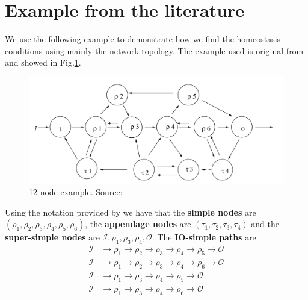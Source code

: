 \section{Example from the literature}
\label{sec:example}

We use the following example to demonstrate how we find the homeostasis 
conditions using mainly the network topology. The example used is original 
from \cite{wang2021} and showed in Fig.\ref{fig:fig1}.

\begin{figure}[H]
    \centering
    \includegraphics[scale=0.36]{figs/fig2_example.png}
    \caption{12-node example. Source: \cite{wang2021}}
    \label{fig:fig1}
\end{figure}

Using the notation provided by \cite{wang2021} we have that the
\textbf{simple nodes} are $(\rho_1, \rho_2, \rho_3, \rho_4, \rho_5, \rho_6)$,
the \textbf{appendage nodes} are $(\tau_1, \tau_2, \tau_3, \tau_4)$ and the 
\textbf{super-simple nodes} are $\mathcal{I}, \rho_1, \rho_3, \rho_4, \mathcal{O}$.
The \textbf{IO-simple paths} are 
\begin{equation}
    \begin{aligned}
        \mathcal{I}& \rightarrow \rho_1 \rightarrow \rho_2 
        \rightarrow \rho_3 \rightarrow \rho_4 \rightarrow \rho_5 \rightarrow \mathcal{O}\\
        \mathcal{I}& \rightarrow \rho_1 \rightarrow \rho_2 
        \rightarrow \rho_3 \rightarrow \rho_4 \rightarrow \rho_6 \rightarrow \mathcal{O}\\
        \mathcal{I}& \rightarrow \rho_1 
        \rightarrow \rho_3 \rightarrow \rho_4 \rightarrow \rho_5 \rightarrow \mathcal{O}\\
        \mathcal{I}& \rightarrow \rho_1 
        \rightarrow \rho_3 \rightarrow \rho_4 \rightarrow \rho_6 \rightarrow \mathcal{O}
    \end{aligned}
\end{equation}  

